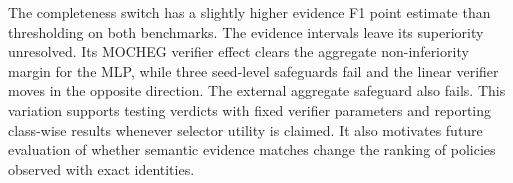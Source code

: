 The completeness switch has a slightly higher evidence F1 point estimate than thresholding on both benchmarks. The evidence intervals leave its superiority unresolved. Its MOCHEG verifier effect clears the aggregate non-inferiority margin for the MLP, while three seed-level safeguards fail and the linear verifier moves in the opposite direction. The external aggregate safeguard also fails. This variation supports testing verdicts with fixed verifier parameters and reporting class-wise results whenever selector utility is claimed. It also motivates future evaluation of whether semantic evidence matches change the ranking of policies observed with exact identities.
